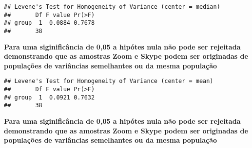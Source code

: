 \documentclass[
]{article}
\newenvironment{Shaded}{\begin{snugshade}}{\end{snugshade}}
\newcommand{\DataTypeTok}[1]{\textcolor[rgb]{0.13,0.29,0.53}{#1}}
\newcommand{\KeywordTok}[1]{\textcolor[rgb]{0.13,0.29,0.53}{\textbf{#1}}}
\newcommand{\NormalTok}[1]{#1}
\newcommand{\OperatorTok}[1]{\textcolor[rgb]{0.81,0.36,0.00}{\textbf{#1}}}
\newcommand{\StringTok}[1]{\textcolor[rgb]{0.31,0.60,0.02}{#1}}
\begin{document}
\begin{verbatim}
## Levene's Test for Homogeneity of Variance (center = median)
##       Df F value Pr(>F)
## group  1  0.0884 0.7678
##       38
\end{verbatim}

\textbf{Para uma siginificância de 0,05 a hipótes nula não pode ser
rejeitada demonstrando que as amostras Zoom e Skype podem ser originadas
de populações de variâncias semelhantes ou da mesma população}

\begin{Shaded}
\end{Shaded}

\begin{verbatim}
## Levene's Test for Homogeneity of Variance (center = mean)
##       Df F value Pr(>F)
## group  1  0.0921 0.7632
##       38
\end{verbatim}

\textbf{Para uma siginificância de 0,05 a hipótes nula não pode ser
rejeitada demonstrando que as amostras Zoom e Skype podem ser originadas
de populações de variâncias semelhantes ou da mesma população}
\end{document}
